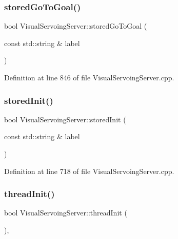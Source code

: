 \subsubsection{\texorpdfstring{stored\+Go\+To\+Goal()}{storedGoToGoal()}}
{\footnotesize\ttfamily bool Visual\+Servoing\+Server\+::stored\+Go\+To\+Goal (\begin{DoxyParamCaption}\item[{const std\+::string \&}]{label }\end{DoxyParamCaption})\hspace{0.3cm}{\ttfamily [override]}}



Definition at line 846 of file Visual\+Servoing\+Server.\+cpp.

\mbox{\label{classVisualServoingServer_abf97ec3877e208f4e889a094298a1e1a}} 
\subsubsection{\texorpdfstring{stored\+Init()}{storedInit()}}
{\footnotesize\ttfamily bool Visual\+Servoing\+Server\+::stored\+Init (\begin{DoxyParamCaption}\item[{const std\+::string \&}]{label }\end{DoxyParamCaption})\hspace{0.3cm}{\ttfamily [override]}}



Definition at line 718 of file Visual\+Servoing\+Server.\+cpp.

\mbox{\label{classVisualServoingServer_aa8673d3ac18d4aa4be94e8354ef0bad5}} 
\subsubsection{\texorpdfstring{thread\+Init()}{threadInit()}}
{\footnotesize\ttfamily bool Visual\+Servoing\+Server\+::thread\+Init (\begin{DoxyParamCaption}{ }\end{DoxyParamCaption})\hspace{0.3cm}{\ttfamily [override]}, {\ttfamily [protected]}}



